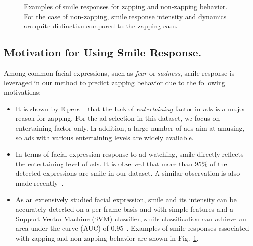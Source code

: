 \documentclass[twoside,leqno,twocolumn]{article}
\begin{document}
\begin{figure}[t] 
\centering
\caption{Examples of smile responses for zapping and non-zapping behavior. For the case of non-zapping, smile response intensity and dynamics are quite distinctive compared to the zapping case.}
\label{fig:smile_ex}
\end{figure}

\subsection{Motivation for Using Smile Response.}
Among common facial expressions, such as \textit{fear} or \textit{sadness}, smile response is leveraged in our method to predict zapping behavior due to the following motivations:
\begin{itemize}
\item It is shown by Elpers \etal~\cite{Elpers03} that the lack of \textit{entertaining} factor in ads is a major reason for zapping. For the ad selection in this dataset, we focus on entertaining factor only. In addition, a large number of ads aim at amusing, so ads with various entertaining levels are widely available. 

\item In terms of facial expression response to ad watching, smile directly reflects the entertaining level of ads. It is observed that more than 95\% of the detected expressions are smile in our dataset. A similar observation is also made recently~\cite{amfed}. 

\item As an extensively studied facial expression, smile and its intensity can be accurately detected on a per frame basis and with simple features and a Support Vector Machine (SVM) classifier, smile classification can achieve an area under the curve (AUC) of 0.95~\cite{Yang_TAC14}. Examples of smile responses associated with zapping and non-zapping behavior are shown in Fig.~\ref{fig:smile_ex}. 


\end{itemize}
\end{document}
